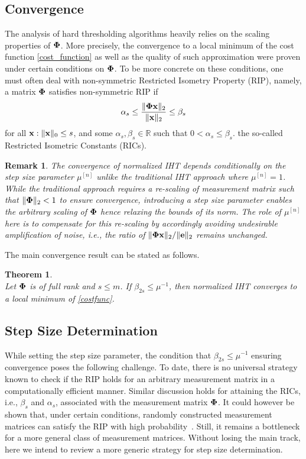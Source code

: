 \documentclass{article}
\newtheorem{theorem}{Theorem}
\newtheorem{remark}{Remark}
\begin{document}
\subsection{Convergence} 
The analysis of hard thresholding algorithms heavily relies on the scaling properties of ${\bf \Phi}$. More precisely, the convergence to a local minimum of the cost function \ref{cost_function} as well as the quality of such approximation were proven under certain conditions on ${\bf \Phi}$. To be more concrete on these conditions, one must often deal with non-symmetric Restricted Isometry Property (RIP), namely, a matrix ${\bf \Phi}$ satisfies non-symmetric RIP if
\begin{equation}\label{rip}
\alpha_{s} \leq \frac{\|{\bf \Phi} {\bf x}\|_2}{\|{\bf x}\|_2} \leq \beta_{s}
\end{equation}
for all ${\bf x}: \|{\bf x}\|_0 \leq s$, and some $\alpha_s, \beta_s \in \mathbb{R}$ such that $0<\alpha_s\leq \beta_s$. the so-called Restricted Isometric Constants (RICs).
\begin{remark}\label{remark_noise_amp}
The convergence of normalized IHT depends conditionally on the step size parameter $\mu^{[n]}$ unlike the traditional IHT approach where $\mu^{[n]}=1$.
While the traditional approach requires a re-scaling of measurement matrix such that $\|{\bf \Phi}\|_2 <1$ to ensure convergence, introducing a step size parameter enables the arbitrary scaling of ${\bf \Phi}$ hence relaxing the bounds of its norm. The role of $\mu^{[n]}$ here is to compensate for this re-scaling by accordingly avoiding undesirable amplification of noise, i.e., the ratio of $\|{\bf \Phi x}\|_2/\|{\bf e}\|_2$ remains unchanged. 
\end{remark}
The main convergence result can be stated as follows.
\begin{theorem}
{\rm{\cite{blumensath2012greedy}}}\\ 
Let ${\bf \Phi}$ is of full rank and $s\leq m$. If $\beta_{2s}\leq\mu^{-1}$, then normalized IHT converges to a local minimum of \ref{costfunc}.
\end{theorem}
\subsection{Step Size Determination} 
While setting the step size parameter, the condition that $\beta_{2s}\leq\mu^{-1}$ ensuring convergence poses the following challenge. To date, there is no universal strategy known to check if the RIP holds for an arbitrary measurement matrix in a computationally efficient manner. Similar discussion holds for attaining the RICs, i.e., ${\beta_s}$ and $\alpha_s$, associated with the measurement matrix ${\bf \Phi}$. It could however be shown that, under certain conditions, randomly constructed measurement matrices can satisfy
the RIP with high probability~\cite{candes2008rip, chartrand2008rip}. Still, it remains a bottleneck for a more general class of
measurement matrices. Without losing the main track, here we intend to review a more generic strategy for step size determination.
\end{document}
